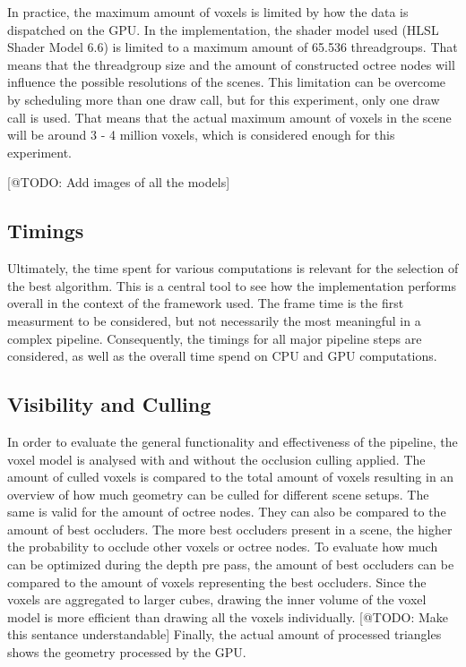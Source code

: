 \noindent
In practice, the maximum amount of voxels is limited by how the data is dispatched on the \ac{GPU}. In the 
implementation, the shader model used (HLSL Shader Model 6.6) is limited to a maximum amount of 65.536 
threadgroups. That means that the threadgroup size and the amount of constructed octree nodes will influence 
the possible resolutions of the scenes. This limitation can be overcome by scheduling more than one draw call, 
but for this experiment, only one draw call is used. That means that the actual maximum amount of voxels in the 
scene will be around 3 - 4 million voxels, which is considered enough for this experiment.

[@TODO: Add images of all the models]


\subsection*{Timings}

Ultimately, the time spent for various computations is relevant for the selection of the best algorithm. This is 
a central tool to see how the implementation performs overall in the context of the framework used. The frame 
time is the first measurment to be considered, but not necessarily the most meaningful in a complex pipeline. 
Consequently, the timings for all major pipeline steps are considered, as well as the overall time spend on \ac{CPU} 
and \ac{GPU} computations. 




\subsection*{Visibility and Culling}

In order to evaluate the general functionality and effectiveness of the pipeline, the voxel model is analysed 
with and without the occlusion culling applied. The amount of culled voxels is compared to the total amount of 
voxels resulting in an overview of how much geometry can be culled for different scene setups. The same is 
valid for the amount of octree nodes. They can also be compared to the amount of best occluders. The more best 
occluders present in a scene, the higher the probability to occlude other voxels or octree nodes. To evaluate 
how much can be optimized during the depth pre pass, the amount of best occluders can be compared to the amount 
of voxels representing the best occluders. Since the voxels are aggregated to larger cubes, drawing the inner 
volume of the voxel model is more efficient than drawing all the voxels individually. [@TODO: Make this sentance 
understandable]  
Finally, the actual amount of processed triangles shows the geometry processed by 
the \ac{GPU}. 

